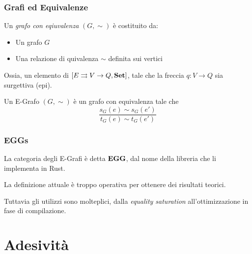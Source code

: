\documentclass[8pt]{beamer}
\begin{document}
\begin{frame}\frametitle{Grafi ed Equivalenze}
	\begin{wrapfigure}{R}{0.4\textwidth}
	\end{wrapfigure}
	
	Un \emph{grafo con eqiuvalenza} $(G, \sim)$ è costituito da:
	\begin{itemize}
		\item Un grafo $G$
		\item Una relazione di quivalenza $\sim$ definita sui vertici
	\end{itemize}
	Ossia, un elemento di $[E \rightrightarrows V \to Q, \mathbf{Set}]$, tale che la freccia $q: V \to Q$ sia surgettiva (epi).

	Un E-Grafo $(G, \sim)$ è un grafo con equivalenza tale che
	\[
		\frac{s_G(e)\sim s_G(e')}{t_G(e) \sim t_G(e')}
	\]
\end{frame}

\begin{frame}\frametitle{EGGs}

			

	La categoria degli E-Grafi è detta $\mathbf{EGG}$, dal nome della libreria che li implementa in Rust.

	\smallskip

	La definizione attuale è troppo operativa per ottenere dei risultati teorici.

	\smallskip

	Tuttavia gli utilizzi sono molteplici, dalla \emph{equality saturation} all'ottimizzazione in fase di compilazione.
\end{frame}

\section{Adesività}
\end{document}
